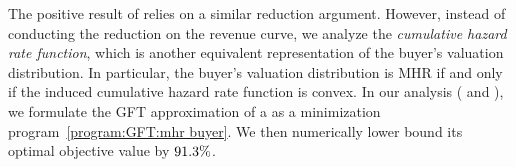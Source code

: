 The positive result of  relies on a similar reduction argument. However, instead of conducting the reduction on the revenue curve, we analyze the \emph{cumulative hazard rate function}, which is another equivalent representation of the buyer's valuation distribution. In particular, the buyer's valuation distribution is MHR if and only if the induced cumulative hazard rate function is convex. In our analysis ( and ), we formulate the GFT approximation of a {\ksfair} {\FixPrice} as a %
minimization program~\ref{program:GFT:mhr buyer}. We then numerically lower bound its optimal objective value by ${91.3\%}$.
